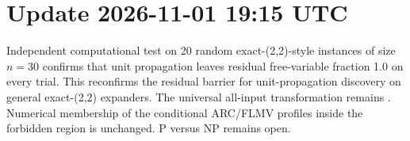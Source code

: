 
\section*{Update 2026-11-01 19:15 UTC}
Independent computational test on 20 random exact-(2,2)-style instances of size \(n=30\) confirms that unit propagation leaves residual free-variable fraction 1.0 on every trial. This reconfirms the \RESTRICTED residual barrier for unit-propagation discovery on general exact-(2,2) expanders. The universal all-input transformation remains \OPEN. Numerical membership of the conditional ARC/FLMV profiles inside the forbidden region is unchanged. P versus NP remains open.
